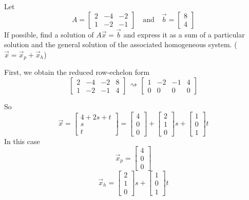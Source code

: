 \documentclass{ximera}
\begin{document}
\begin{example}
Let $$A=\begin{bmatrix}2&-4&-2\\1&-2&-1\end{bmatrix}\quad\text{and}\quad \vec{b}=\begin{bmatrix}8\\4\end{bmatrix}$$
If possible, find a solution of $A\vec{x}=\vec{b}$ and express it as a sum of a particular solution and the general solution of the associated homogeneous system. ($\vec{x}=\vec{x}_p+\vec{x}_h$)
\begin{explanation}
First, we obtain the reduced row-echelon form
$$\left[\begin{array}{ccc|c}  
 2&-4&-2&8\\1&-2&-1&4
 \end{array}\right]\begin{array}{c}
 \\
 \rightsquigarrow\\
 \\
 \end{array}\left[\begin{array}{ccc|c}  
 1&-2&-1&4\\0&0&0&0
 \end{array}\right]$$
 
 So $$\vec{x}=\begin{bmatrix}4+2s+t\\s\\t\end{bmatrix}=\begin{bmatrix}4\\0\\0\end{bmatrix}+\begin{bmatrix}2\\1\\0\end{bmatrix}s+\begin{bmatrix}1\\0\\1\end{bmatrix}t$$
 In this case $$\vec{x}_p=\begin{bmatrix}4\\0\\0\end{bmatrix}$$
 $$\vec{x}_h=\begin{bmatrix}2\\1\\0\end{bmatrix}s+\begin{bmatrix}1\\0\\1\end{bmatrix}t$$
\end{explanation}
\end{example}
\end{document}
